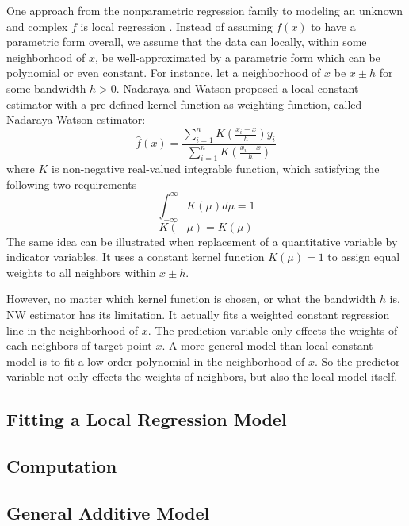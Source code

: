 One approach from the nonparametric regression family to modeling an unknown and
complex $f$ is local regression \cite{Cleveland:1979}. Instead of assuming 
$f(x)$ to have a parametric form overall, we assume that the data can locally, 
within some neighborhood of $x$, be well-approximated by a parametric form which 
can be polynomial or even constant. For instance, let a neighborhood of $x$ be
$x \pm h$ for some bandwidth $h > 0$.
Nadaraya \cite{nadaraya1964} and Watson \cite{watson1964} proposed a local 
constant estimator with a pre-defined kernel function as weighting function, 
called Nadaraya-Watson estimator:
\begin{equation} 
\hat f(x) = \frac{\sum_{i=1}^n K(\frac{x_i - x}{h})y_i}{\sum_{i=1}^n K(\frac{x_i - x}{h})}
\end{equation} 
where $K$ is non-negative real-valued integrable function, which satisfying the 
following two requirements
\begin{equation} 
\int_{-\infty}^{\infty} K(\mu)d\mu = 1
\end{equation} 
\begin{equation} 
K(-\mu) = K(\mu)
\end{equation}
The same idea can be illustrated when replacement of a quantitative variable by
indicator variables. It uses a constant kernel function $K(\mu) = 1$ to assign
equal weights to all neighbors within $x\pm h$. 

However, no matter which kernel function is chosen, or what the bandwidth $h$ is,
NW estimator has its limitation. It actually fits a weighted constant regression
line in the neighborhood of $x$. The prediction variable only effects the weights
of each neighbors of target point $x$. A more general model than local constant
model is to fit a low order polynomial in the neighborhood of $x$. So the predictor
variable not only effects the weights of neighbors, but also the local model itself.


\subsection{Fitting a Local Regression Model}
\label{sec:loess}

\subsection{Computation}

\subsection{General Additive Model}

